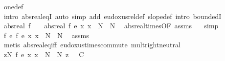 \begin{isabellebody}
\ one{\isacharunderscore}{\kern0pt}def\ \isamarkupfalse%
\ {\isacharparenleft}{\kern0pt}intro\ abs{\isacharunderscore}{\kern0pt}real{\isacharunderscore}{\kern0pt}eqI{\isacharparenright}{\kern0pt}\ {\isacharparenleft}{\kern0pt}auto\ simp\ add{\isacharcolon}{\kern0pt}\ eudoxus{\isacharunderscore}{\kern0pt}rel{\isacharunderscore}{\kern0pt}def\ slope{\isacharunderscore}{\kern0pt}def\ intro{\isacharbang}{\kern0pt}{\isacharcolon}{\kern0pt}\ boundedI{\isacharparenright}{\kern0pt}\isanewline
\ \ \isamarkupfalse%
\ {\isachardoublequoteopen}abs{\isacharunderscore}{\kern0pt}real\ f\ {\isacharasterisk}{\kern0pt}\ {}\ {\isacharequal}{\kern0pt}\ abs{\isacharunderscore}{\kern0pt}real\ {\isacharparenleft}{\kern0pt}f\ {\isacharasterisk}{\kern0pt}\isactrlsub e\ {\isacharparenleft}{\kern0pt}{\isasymlambda}x{\isachardot}{\kern0pt}\ x\ {\isacharplus}{\kern0pt}\ N{\isacharprime}{\kern0pt}\ {\isacharminus}{\kern0pt}\ N{\isacharparenright}{\kern0pt}{\isacharparenright}{\kern0pt}{\isachardoublequoteclose}\ \isamarkupfalse%
\ abs{\isacharunderscore}{\kern0pt}real{\isacharunderscore}{\kern0pt}times{\isacharbrackleft}{\kern0pt}OF\ assms{\isacharparenleft}{\kern0pt}{}{\isacharparenright}{\kern0pt}\ {\isacharasterisk}{\kern0pt}{\isacharparenleft}{\kern0pt}{}{\isacharparenright}{\kern0pt}{\isacharbrackright}{\kern0pt}\ \isamarkupfalse%
\ simp\isanewline
\ \ \isamarkupfalse%
\ {\isachardoublequoteopen}f\ {\isasymsim}\isactrlsub e\ {\isacharparenleft}{\kern0pt}f\ {\isacharasterisk}{\kern0pt}\isactrlsub e\ {\isacharparenleft}{\kern0pt}{\isasymlambda}x{\isachardot}{\kern0pt}\ x\ {\isacharplus}{\kern0pt}\ N{\isacharprime}{\kern0pt}\ {\isacharminus}{\kern0pt}\ N{\isacharparenright}{\kern0pt}{\isacharparenright}{\kern0pt}{\isachardoublequoteclose}\ \isamarkupfalse%
\ assms\ {\isacharasterisk}{\kern0pt}\ \isamarkupfalse%
\ {\isacharparenleft}{\kern0pt}metis\ abs{\isacharunderscore}{\kern0pt}real{\isacharunderscore}{\kern0pt}eq{\isacharunderscore}{\kern0pt}iff\ eudoxus{\isacharunderscore}{\kern0pt}times{\isacharunderscore}{\kern0pt}commute\ mult{\isachardot}{\kern0pt}right{\isacharunderscore}{\kern0pt}neutral{\isacharparenright}{\kern0pt}\isanewline
\ \ \isamarkupfalse%
\ \isamarkupfalse%
\ {\isachardoublequoteopen}{\isasymforall}z{\isasymge}N{\isachardot}{\kern0pt}\ {\isacharparenleft}{\kern0pt}f\ {\isacharasterisk}{\kern0pt}\isactrlsub e\ {\isacharparenleft}{\kern0pt}{\isasymlambda}x{\isachardot}{\kern0pt}\ x\ {\isacharplus}{\kern0pt}\ N{\isacharprime}{\kern0pt}\ {\isacharminus}{\kern0pt}\ N{\isacharparenright}{\kern0pt}{\isacharparenright}{\kern0pt}\ z\ {\isasymle}\ {\isacharminus}{\kern0pt}\ C{\isachardoublequoteclose}\ \isamarkupfalse%

\end{isabellebody}
